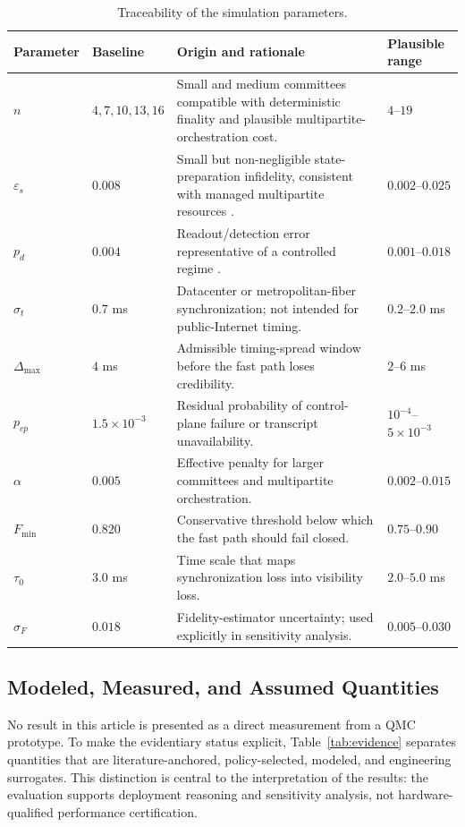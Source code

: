 \documentclass{ieeeaccess}
\begin{document}
\begin{table}[!t]
\caption{Traceability of the simulation parameters.}
\label{tab:params}
\centering
\scriptsize
\setlength{\tabcolsep}{4pt}
\renewcommand{\arraystretch}{1.13}
\begin{tabularx}{\textwidth}{p{1.2cm}p{1.55cm}Yp{2.45cm}}
\toprule
\textbf{Parameter} & \textbf{Baseline} & \textbf{Origin and rationale} & \textbf{Plausible range} \\
\midrule
$n$ & $4,7,10,13,16$ & Small and medium committees compatible with deterministic finality and plausible multipartite-orchestration cost. & $4$--$19$ \\
$\varepsilon_s$ & $0.008$ & Small but non-negligible state-preparation infidelity, consistent with managed multipartite resources \cite{b19,b20}. & $0.002$--$0.025$ \\
$p_d$ & $0.004$ & Readout/detection error representative of a controlled regime \cite{b12}. & $0.001$--$0.018$ \\
$\sigma_t$ & $0.7$ ms & Datacenter or metropolitan-fiber synchronization; not intended for public-Internet timing. & $0.2$--$2.0$ ms \\
$\Delta_{\max}$ & $4$ ms & Admissible timing-spread window before the fast path loses credibility. & $2$--$6$ ms \\
$p_{cp}$ & $1.5\times 10^{-3}$ & Residual probability of control-plane failure or transcript unavailability. & $10^{-4}$--$5\times 10^{-3}$ \\
$\alpha$ & $0.005$ & Effective penalty for larger committees and multipartite orchestration. & $0.002$--$0.015$ \\
$F_{\min}$ & $0.820$ & Conservative threshold below which the fast path should fail closed. & $0.75$--$0.90$ \\
$\tau_0$ & $3.0$ ms & Time scale that maps synchronization loss into visibility loss. & $2.0$--$5.0$ ms \\
$\sigma_F$ & $0.018$ & Fidelity-estimator uncertainty; used explicitly in sensitivity analysis. & $0.005$--$0.030$ \\
\bottomrule
\end{tabularx}
\end{table}

\subsection{Modeled, Measured, and Assumed Quantities}
No result in this article is presented as a direct measurement from a QMC prototype. To make the evidentiary status explicit, Table~\ref{tab:evidence} separates quantities that are literature-anchored, policy-selected, modeled, and engineering surrogates. This distinction is central to the interpretation of the results: the evaluation supports deployment reasoning and sensitivity analysis, not hardware-qualified performance certification.
\end{document}
